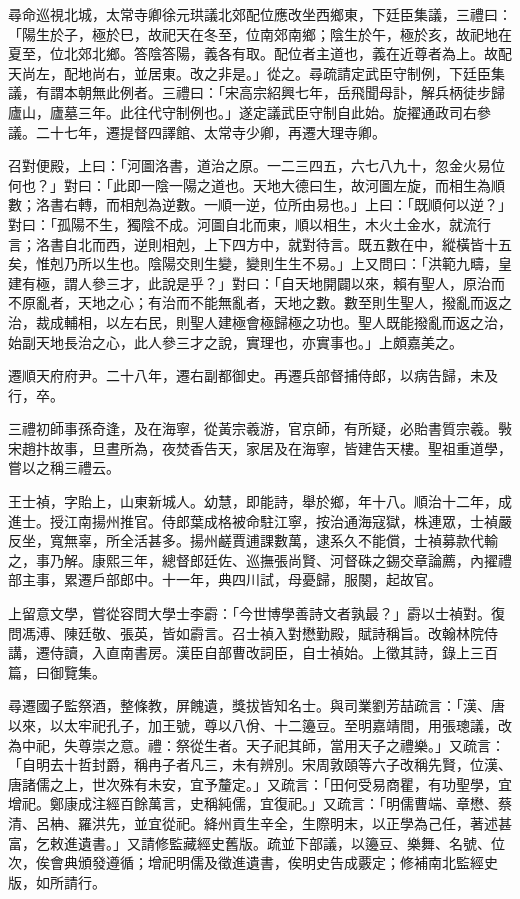 \begin{pinyinscope}
尋命巡視北城，太常寺卿徐元珙議北郊配位應改坐西鄉東，下廷臣集議，三禮曰：「陽生於子，極於巳，故祀天在冬至，位南郊南鄉；陰生於午，極於亥，故祀地在夏至，位北郊北鄉。答陰答陽，義各有取。配位者主道也，義在近尊者為上。故配天尚左，配地尚右，並居東。改之非是。」從之。尋疏請定武臣守制例，下廷臣集議，有謂本朝無此例者。三禮曰：「宋高宗紹興七年，岳飛聞母訃，解兵柄徒步歸廬山，廬墓三年。此往代守制例也。」遂定議武臣守制自此始。旋擢通政司右參議。二十七年，遷提督四譯館、太常寺少卿，再遷大理寺卿。

召對便殿，上曰：「河圖洛書，道治之原。一二三四五，六七八九十，忽金火易位何也？」對曰：「此即一陰一陽之道也。天地大德曰生，故河圖左旋，而相生為順數；洛書右轉，而相剋為逆數。一順一逆，位所由易也。」上曰：「既順何以逆？」對曰：「孤陽不生，獨陰不成。河圖自北而東，順以相生，木火土金水，就流行言；洛書自北而西，逆則相剋，上下四方中，就對待言。既五數在中，縱橫皆十五矣，惟剋乃所以生也。陰陽交則生變，變則生生不易。」上又問曰：「洪範九疇，皇建有極，謂人參三才，此說是乎？」對曰：「自天地開闢以來，賴有聖人，原治而不原亂者，天地之心；有治而不能無亂者，天地之數。數至則生聖人，撥亂而返之治，裁成輔相，以左右民，則聖人建極會極歸極之功也。聖人既能撥亂而返之治，始副天地長治之心，此人參三才之說，實理也，亦實事也。」上頗嘉美之。

遷順天府府尹。二十八年，遷右副都御史。再遷兵部督捕侍郎，以病告歸，未及行，卒。

三禮初師事孫奇逢，及在海寧，從黃宗羲游，官京師，有所疑，必貽書質宗羲。斅宋趙抃故事，旦晝所為，夜焚香告天，家居及在海寧，皆建告天樓。聖祖重道學，嘗以之稱三禮云。

王士禎，字貽上，山東新城人。幼慧，即能詩，舉於鄉，年十八。順治十二年，成進士。授江南揚州推官。侍郎葉成格被命駐江寧，按治通海寇獄，株連眾，士禎嚴反坐，寬無辜，所全活甚多。揚州鹺賈逋課數萬，逮系久不能償，士禎募款代輸之，事乃解。康熙三年，總督郎廷佐、巡撫張尚賢、河督硃之錫交章論薦，內擢禮部主事，累遷戶部郎中。十一年，典四川試，母憂歸，服闋，起故官。

上留意文學，嘗從容問大學士李霨：「今世博學善詩文者孰最？」霨以士禎對。復問馮溥、陳廷敬、張英，皆如霨言。召士禎入對懋勤殿，賦詩稱旨。改翰林院侍講，遷侍讀，入直南書房。漢臣自部曹改詞臣，自士禎始。上徵其詩，錄上三百篇，曰御覽集。

尋遷國子監祭酒，整條教，屏餽遺，獎拔皆知名士。與司業劉芳喆疏言：「漢、唐以來，以太牢祀孔子，加王號，尊以八佾、十二籩豆。至明嘉靖間，用張璁議，改為中祀，失尊崇之意。禮：祭從生者。天子祀其師，當用天子之禮樂。」又疏言：「自明去十哲封爵，稱冉子者凡三，未有辨別。宋周敦頤等六子改稱先賢，位漢、唐諸儒之上，世次殊有未安，宜予釐定。」又疏言：「田何受易商瞿，有功聖學，宜增祀。鄭康成注經百餘萬言，史稱純儒，宜復祀。」又疏言：「明儒曹端、章懋、蔡清、呂柟、羅洪先，並宜從祀。絳州貢生辛全，生際明末，以正學為己任，著述甚富，乞敕進遺書。」又請修監藏經史舊版。疏並下部議，以籩豆、樂舞、名號、位次，俟會典頒發遵循；增祀明儒及徵進遺書，俟明史告成覈定；修補南北監經史版，如所請行。


\end{pinyinscope}
